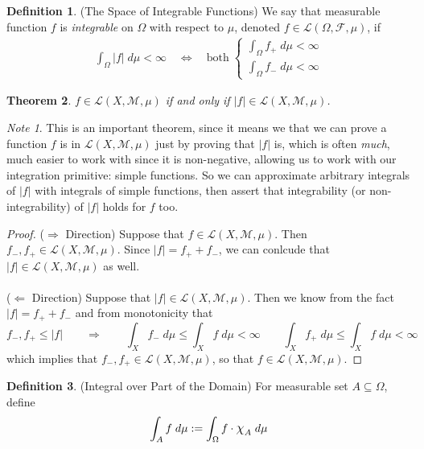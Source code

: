 \documentclass[12pt]{article}
\theoremstyle{plain}
\newtheorem{thm}{Theorem}[section]
\theoremstyle{definition}
\newtheorem{defn}[thm]{Definition}
\theoremstyle{remark}
\newtheorem*{note}{Note}
\newcommand*{\Chi}{\mbox{\large$\chi$}} %
\newcommand{\sF}{\mathscr{F}}
\begin{document}
\begin{defn}(The Space of Integrable Functions)
We say that measurable function $f$ is \emph{integrable}
on $\Omega$ with respect to $\mu$, denoted
$f\in\mathscr{L}(\Omega,\sF,\mu)$, if
\begin{align*}
  \int_\Omega |f| \; d\mu < \infty
  \quad\iff\quad
  \text{both} \;
  \begin{cases}
    \int_\Omega f_+ \; d\mu < \infty \\
    \int_\Omega f_- \; d\mu < \infty
  \end{cases}
\end{align*}
\end{defn}

\begin{thm}
$f\in\mathscr{L}(X,\mathscr{M},\mu)$ if and only if $|f|\in\mathscr{L}(X,\mathscr{M},\mu)$.
\end{thm}
\begin{note}
This is an important theorem, since it means we that we can prove a function $f$ is in $\mathscr{L}(X,\mathscr{M},\mu)$ just by proving that $|f|$ is, which is often \emph{much}, much easier to work with since it is non-negative, allowing us to work with our integration primitive: simple functions. So we can approximate arbitrary integrals of $|f|$ with integrals of simple functions, then assert that integrability (or non-integrability) of $|f|$ holds for $f$ too.
\end{note}
\begin{proof}
($\Rightarrow$ Direction) Suppose that $f\in\mathscr{L}(X,\mathscr{M},\mu)$. Then $f_-, f_+\in\mathscr{L}(X,\mathscr{M},\mu)$. Since $|f|=f_+ + f_-$, we can conlcude that $|f|\in\mathscr{L}(X,\mathscr{M},\mu)$ as well.
\\
\\
($\Leftarrow$ Direction) Suppose that $|f|\in\mathscr{L}(X,\mathscr{M},\mu)$. Then we know from the fact $|f|=f_+ + f_-$ and from monotonicity that
\[
    f_-, f_+ \leq |f| \qquad \Rightarrow
    \qquad
    \int_X f_- \; d\mu \leq \int_X f \; d\mu <\infty\qquad
    \int_X f_+ \; d\mu \leq \int_X f \; d\mu <\infty
\]
which implies that $f_-, f_+\in\mathscr{L}(X,\mathscr{M},\mu)$, so that $f\in\mathscr{L}(X,\mathscr{M},\mu)$.
\end{proof}

\begin{defn}(Integral over Part of the Domain)
For measurable set $A\subseteq \Omega$, define
\begin{align*}
  \int_{A} f\; d\mu
  :=
  \int_{\Omega} f\cdot\Chi_A\; d\mu
\end{align*}
\end{defn}
\end{document}
